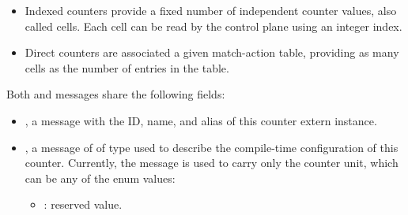 \documentclass[11pt]{article}
\begin{document}
{%
\begin{itemize}%

\item{}
Indexed counters provide a fixed number of independent counter values, also
called cells. Each cell can be read by the control plane using an integer
index.%

\item{}
Direct counters are associated a given match-action table, providing as many
cells as the number of entries in the table.%
\end{itemize}%

\noindent{}Both  and  messages share the following fields:%

\begin{itemize}%

\item{}
, a  message with the ID, name, and alias of this counter
extern instance.%

\item{}
, a message of of type  used to describe the compile-time
configuration of this counter. Currently, the  message is used to
carry only the counter unit, which can be any of the  enum
values:%

\begin{itemize}[noitemsep,topsep=\mdcompacttopsep]%

\item{}: reserved value.%


\end{itemize}
\end{itemize}}
\end{document}
